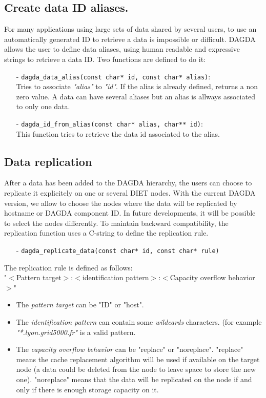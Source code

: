 \subsection{Create data ID aliases.}
For many applications using large sets of data shared by several users, to
use an automatically generated ID to retrieve a data is impossible or difficult.
DAGDA allows the user to define data aliases, using human readable and
expressive strings to retrieve a data ID. Two functions are defined to do it:
\begin{itemize}
\item[-] \verb#dagda_data_alias(const char* id, const char* alias)#:\\
  Tries to associate \textit{"alias"} to \textit{"id"}. If the alias is
  already defined, returns a non zero value. A data can have several aliases
  but an alias is allways associated to only one data.
\item[-] \verb#dagda_id_from_alias(const char* alias, char** id)#:\\
  This function tries to retrieve the data id associated to the alias.
\end{itemize}

\subsection{Data replication}
After a data has been added to the DAGDA hierarchy, the users can choose to
replicate it explicitely on one or several DIET nodes. With the current
DAGDA version, we allow to choose the nodes where the data will be replicated
by hostname or DAGDA component ID. In future developments, it will be
possible to select the nodes differently. To maintain backward compatibility,
the replication function uses a C-string to define the replication rule.
\begin{itemize}
\item[-] \verb#dagda_replicate_data(const char* id, const char* rule)#
\end{itemize}
The replication rule is defined as follows:\\
"$<$Pattern target$>$:$<$identification pattern$>$:$<$Capacity overflow
behavior$>$"\\
\begin{itemize}
\item The \textit{pattern target} can be "ID" or "host".
\item The \textit{identification pattern} can contain some \textit{wildcards}
  characters. (for example \textit{"*.lyon.grid5000.fr"} is a valid pattern.
\item The \textit{capacity overflow behavior} can be "replace" or "noreplace".
  "replace" means the cache replacement algorithm will be used if available on
  the target node (a data could be deleted from the node to leave space to
  store the new one). "noreplace" means that the data will be replicated on
  the node if and only if there is enough storage capacity on it.
\end{itemize}

